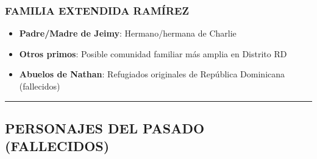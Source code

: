 \documentclass[11pt,a4paper]{report}
\begin{document}
\subsubsection{FAMILIA EXTENDIDA RAMÍREZ}
\begin{itemize}
  \item \textbf{Padre/Madre de Jeimy}: Hermano/hermana de Charlie
  \item \textbf{Otros primos}: Posible comunidad familiar más amplia en Distrito RD
  \item \textbf{Abuelos de Nathan}: Refugiados originales de República Dominicana (fallecidos)

\end{itemize}
\bigskip\hrule\bigskip

\subsection{PERSONAJES DEL PASADO (FALLECIDOS)}
\end{document}
